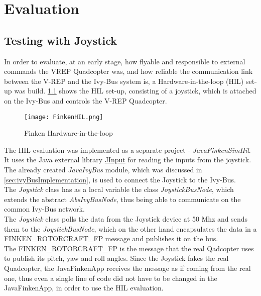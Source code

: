 \chapter{Evaluation}
\label{sec:eval}

\section{Testing with Joystick}


In order to evaluate, at an early stage, how flyable and responsible to external commands the VREP Quadcopter was, and how reliable the communication link between the V-REP and the Ivy-Bus system is, a Hardware-in-the-loop (HIL) set-up was build. \ref{fig:finkenHIL} shows the HIL set-up, consisting of a joystick, which is attached on the Ivy-Bus and controls the V-REP Quadcopter.


\begin{figure}[h!]
 \begin{center}
  \texttt{[image: FinkenHIL.png]}
 \end{center}
  \caption{Finken Hardware-in-the-loop\label{fig:finkenHIL}}
\end{figure}

The HIL evaluation was implemented as a separate project - \textit{JavaFinkenSimHil}. It uses the Java external library \href{https://java.net/projects/jinput}{JInput} for reading the inputs from the joystick. The already created \textit{JavaIvyBus} module, which was discussed in \ref{sec:ivyBusImplementation}, is used to connect the Joystick to the Ivy-Bus. \\
The \textit{Joystick} class has as a local variable the class \textit{JoystickBusNode}, which extends the abstract \textit{AbsIvyBusNode}, thus being able to communicate on the common Ivy-Bus network. \\
The \textit{Joystick} class polls the data from the Joystick device at 50 Mhz and sends them to the \textit{JoystickBusNode}, which on the other hand encapsulates the data in 
a FINKEN\_ROTORCRAFT\_FP message and publishes it on the bus. \\ 
The FINKEN\_ROTORCRAFT\_FP is the message that the real Qadcopter uses to publish its pitch, yaw and roll angles. Since the Joystick fakes the real Quadcopter, the JavaFinkenApp receives the message as if coming from the real one, thus even a single line of code did not have to be changed in the JavaFinkenApp, in order to use the HIL evaluation. \\

